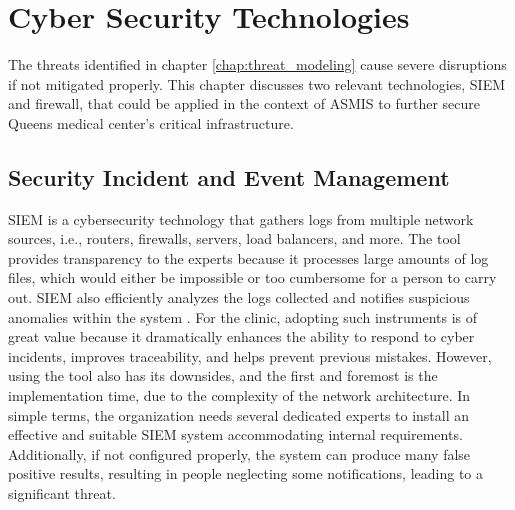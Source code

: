 \chapter{Cyber Security Technologies}
The threats identified in chapter \ref{chap:threat_modeling} cause severe disruptions if not mitigated properly. This chapter discusses two relevant technologies, SIEM and firewall, that could be applied in the context of ASMIS to further secure Queens medical center's critical infrastructure.

\section{Security Incident and Event Management}
SIEM is a cybersecurity technology that gathers logs from multiple network sources, i.e., routers, firewalls, servers, load balancers, and more. The tool provides transparency to the experts because it processes large amounts of log files, which would either be impossible or too cumbersome for a person to carry out. SIEM also efficiently analyzes the logs collected and notifies suspicious anomalies within the system \citep[p.~1]{SIEM}. For the clinic, adopting such instruments is of great value because it dramatically enhances the ability to respond to cyber incidents, improves traceability, and helps prevent previous mistakes. \newline\newline 
However, using the tool also has its downsides, and the first and foremost is the implementation time, due to the complexity of the network architecture. In simple terms, the organization needs several dedicated experts to install an effective and suitable SIEM system accommodating internal requirements. Additionally, if not configured properly, the system can produce many false positive results, resulting in people neglecting some notifications, leading to a significant threat.

